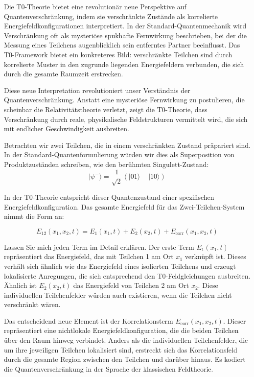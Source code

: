 \documentclass[12pt,a4paper]{article}
\theoremstyle{definition}
\theoremstyle{remark}
\begin{document}
Die T0-Theorie bietet eine revolutionär neue Perspektive auf Quantenverschränkung, indem sie verschränkte Zustände als korrelierte Energiefeldkonfigurationen interpretiert. In der Standard-Quantenmechanik wird Verschränkung oft als mysteriöse spukhafte Fernwirkung beschrieben, bei der die Messung eines Teilchens augenblicklich sein entferntes Partner beeinflusst. Das T0-Framework bietet ein konkreteres Bild: verschränkte Teilchen sind durch korrelierte Muster in den zugrunde liegenden Energiefeldern verbunden, die sich durch die gesamte Raumzeit erstrecken.

Diese neue Interpretation revolutioniert unser Verständnis der Quantenverschränkung. Anstatt eine mysteriöse Fernwirkung zu postulieren, die scheinbar die Relativitätstheorie verletzt, zeigt die T0-Theorie, dass Verschränkung durch reale, physikalische Feldstrukturen vermittelt wird, die sich mit endlicher Geschwindigkeit ausbreiten.

Betrachten wir zwei Teilchen, die in einem verschränkten Zustand präpariert sind. In der Standard-Quantenformulierung würden wir dies als Superposition von Produktzuständen schreiben, wie den berühmten Singulett-Zustand:
$$|\psi^-\rangle = \frac{1}{\sqrt{2}}(|01\rangle - |10\rangle)$$

In der T0-Theorie entspricht dieser Quantenzustand einer spezifischen Energiefeldkonfiguration. Das gesamte Energiefeld für das Zwei-Teilchen-System nimmt die Form an:

\begin{equation}
	E_{12}(x_1,x_2,t) = E_1(x_1,t) + E_2(x_2,t) + E_{\text{corr}}(x_1,x_2,t)
	\label{eq:entangled_energy}
\end{equation}

Lassen Sie mich jeden Term im Detail erklären. Der erste Term $E_1(x_1,t)$ repräsentiert das Energiefeld, das mit Teilchen 1 am Ort $x_1$ verknüpft ist. Dieses verhält sich ähnlich wie das Energiefeld eines isolierten Teilchens und erzeugt lokalisierte Anregungen, die sich entsprechend den T0-Feldgleichungen ausbreiten. Ähnlich ist $E_2(x_2,t)$ das Energiefeld von Teilchen 2 am Ort $x_2$. Diese individuellen Teilchenfelder würden auch existieren, wenn die Teilchen nicht verschränkt wären.

Das entscheidend neue Element ist der Korrelationsterm $E_{\text{corr}}(x_1,x_2,t)$. Dieser repräsentiert eine nichtlokale Energiefeldkonfiguration, die die beiden Teilchen über den Raum hinweg verbindet. Anders als die individuellen Teilchenfelder, die um ihre jeweiligen Teilchen lokalisiert sind, erstreckt sich das Korrelationsfeld durch die gesamte Region zwischen den Teilchen und darüber hinaus. Es kodiert die Quantenverschränkung in der Sprache der klassischen Feldtheorie.
\end{document}
